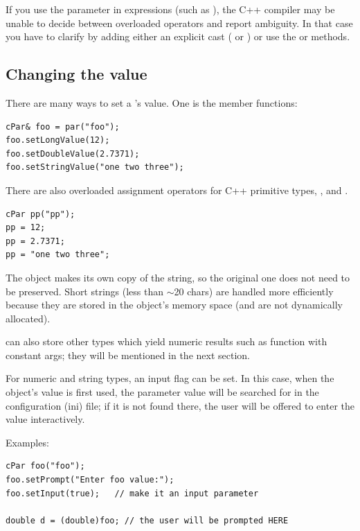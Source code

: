 If you use the  parameter in expressions (such as
), the C++ compiler may be unable to decide
between overloaded operators and report ambiguity. In that case
you have to clarify by adding either an explicit cast
( or ) or use
the  or  methods.

\subsection{Changing the value}

There are many ways to set a 's value. One is the 
member functions:

\begin{verbatim}
cPar& foo = par("foo");
foo.setLongValue(12);
foo.setDoubleValue(2.7371);
foo.setStringValue("one two three");
\end{verbatim}

There are also overloaded assignment operators for C++ primitive types,
, and .

\begin{verbatim}
cPar pp("pp");
pp = 12;
pp = 2.7371;
pp = "one two three";
\end{verbatim}

The  object makes its own copy of the string, so the
original one does not need to be preserved. Short strings (less than
\ensuremath{\sim}20 chars) are handled more efficiently because they
are stored in the object's memory space (and are not dynamically
allocated).

 can also store other types which yield numeric
results such as function with constant args;
they will be mentioned in the next section.

For numeric and string types, an input flag can be
set. In this case, when the object's value is first used, the
parameter value will be searched for in the configuration (ini)
file; if it is not found there, the user will be offered
to enter the value interactively.

Examples:

\begin{verbatim}
cPar foo("foo");
foo.setPrompt("Enter foo value:");
foo.setInput(true);   // make it an input parameter

double d = (double)foo; // the user will be prompted HERE
\end{verbatim}

